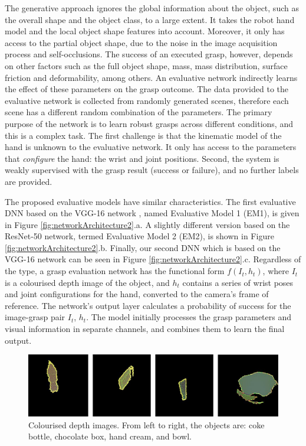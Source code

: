 The generative approach ignores the global information about the object, such as the overall shape and the object class, to a large extent. It takes the robot hand model and the local object shape features into account. Moreover, it only has access to the partial object shape, due to the noise in the image acquisition process and self-occlusions. The success of an executed grasp, however, depends on other factors such as the full object shape, mass, mass distribution, surface friction and deformability, among others. An evaluative network indirectly learns the effect of these parameters on the grasp outcome. The data provided to the evaluative network is collected from randomly generated scenes, therefore each scene has a different random combination of the parameters. The primary purpose of the network is to learn robust grasps across different conditions, and this is a complex task. The first challenge is that the kinematic model of the hand is unknown to the evaluative network. It only has access to the parameters that \textit{configure} the hand: the wrist and joint positions. Second, the system is weakly supervised with the grasp result (success or failure), and no further labels are provided.

The proposed evaluative models have similar characteristics. The first evaluative DNN based on the VGG-16 network \cite{Simonyan14c}, named Evaluative Model 1 (EM1), is given in Figure \ref{fig:networkArchitecture2}.a. A slightly different version based on the ResNet-50 network, termed Evaluative Model 2 (EM2), is shown in Figure \ref{fig:networkArchitecture2}.b. Finally, our second DNN which is based on the VGG-16 network can be seen in Figure \ref{fig:networkArchitecture2}.c. Regardless of the type, a grasp evaluation network has the functional form $f(I_t, h_t)$, where $I_t$ is a colourised depth image of the object, and $h_t$ contains a series of wrist poses and joint configurations for the hand, converted to the camera's frame of reference. The network's output layer calculates a probability of success for the image-grasp pair $I_t$, $h_t$. The model initially processes the grasp parameters and visual information in separate channels, and combines them to learn the final output. 

\begin{figure}[h]
  \includegraphics[width=0.9\linewidth]{images/colourDepth.pdf}
  \caption[Colourised depth images.]{Colourised depth images. From left to right, the objects are: coke bottle, chocolate box, hand cream, and bowl.}
\label{fig:colorisedDepth}
\end{figure}

